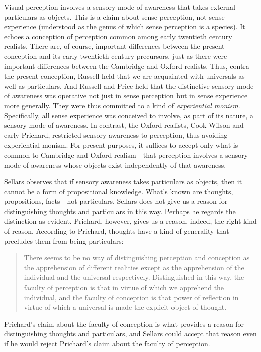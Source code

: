 \documentclass[12pt]{article}
\begin{document}
Visual perception involves a sensory mode of awareness that takes external particulars as objects. This is a claim about sense perception, not sense experience (understood as the genus of which sense perception is a species). It echoes a conception of perception common among early twentieth century realists. There are, of course, important differences between the present conception and its early twentieth century precursors, just as there were important differences between the Cambridge and Oxford realists. Thus, contra the present conception, Russell held that we are acquainted with universals as well as particulars. And Russell and Price held that the distinctive sensory mode of awareness was operative not just in sense perception but in sense experience more generally. They were thus committed to a kind of \emph{experiential monism}. Specifically, all sense experience was conceived to involve, as part of its nature, a sensory mode of awareness. In contrast, the Oxford realists, Cook-Wilson and early Prichard, restricted sensory awareness to perception, thus avoiding experiential monism. For present purposes, it suffices to accept only what is common to Cambridge and Oxford realism---that perception involves a sensory mode of awareness whose objects exist independently of that awareness. 

Sellars observes that if sensory awareness takes particulars as objects, then it cannot be a form of propositional knowledge. What's known are thoughts, propositions, facts\----\-not par\-ti\-cu\-lars. Sellars does not give us a reason for distinguishing thoughts and particulars in this way. Perhaps he regards the distinction as evident. Prichard, however, gives us a reason, indeed, the right kind of reason. According to Prichard, thoughts have a kind of generality that precludes them from being particulars:
\begin{quote}
	There seems to be no way of distinguishing perception and conception as the apprehension of different realities except as the apprehension of the individual and the universal respectively. Distinguished in this way, the faculty of perception is that in virtue of which we apprehend the individual, and the faculty of conception is that power of reflection in virtue of which a universal is made the explicit object of thought.
\end{quote}
Prichard's claim about the faculty of conception is what provides a reason for distinguishing thoughts and particulars, and Sellars could accept that reason even if he would reject Prichard's claim about the faculty of perception.
\end{document}
